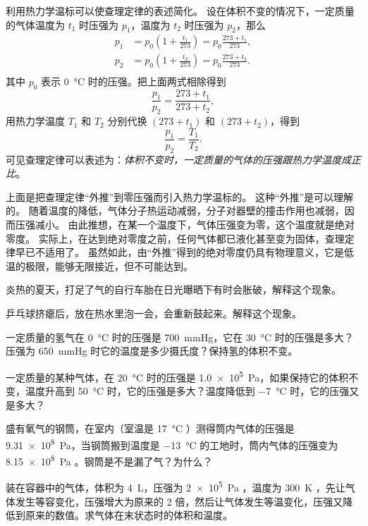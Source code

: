 利用热力学温标可以使查理定律的表述简化。
设在体积不变的情况下，一定质量的气体温度为 $t_1$ 时压强为 $p_1$，温度为 $t_2$ 时压强为 $p_2$，那么
\[\begin{split}
p_1&=p_0\left(1+\frac{t_1}{273}\right)=p_0\frac{273+t_1}{273},\\
p_2&=p_0\left(1+\frac{t_2}{273}\right)=p_0\frac{273+t_2}{273}.\\
\end{split} \]
其中 $p_0$ 表示 \qty{0}{\celsius} 时的压强。把上面两式相除得到
\[\frac{p_1}{p_2}=\frac{273+t_1}{273+t_2},\]
用热力学温度 $T_1$ 和 $T_2$ 分别代换 $(273+t_1)$ 和 $(273+t_2)$，得到
\[\frac{p_1}{p_2}=\frac{T_1}{T_2}.\]
可见查理定律可以表述为：\emph{体积不变时，一定质量的气体的压强跟热力学温度成正比}。

上面是把查理定律“外推”到零压强而引入热力学温标的。
这种“外推”是可以理解的。
随着温度的降低，气体分子热运动减弱，分子对器壁的撞击作用也减弱，因而压强减小。
由此推想，在某一个温度下，气体压强变为零，这个温度就是绝对零度。
实际上，在达到绝对零度之前，任何气体都已液化甚至变为固体，查理定律早已不适用了。
虽然如此，由“外推”得到的绝对零度仍具有物理意义，它是低温的极限，能够无限接近，但不可能达到。

\begin{Practice}
\begin{question}
	\item 炎热的夏天，打足了气的自行车胎在日光曝晒下有时会胀破，解释这个现象。
	\item 乒乓球挤瘪后，放在热水里泡一会，会重新鼓起来。解释这个现象。
	\item 一定质量的氢气在 \qty{0}{\celsius} 时的压强是 \qty{700}{mmHg}，它在 \qty{30}{\celsius} 时的压强是多大？压强为 \qty{650}{mmHg} 时它的温度是多少摄氏度？保持氢的体积不变。
	\item 一定质量的某种气体，在 \qty{20}{\celsius} 时的压强是 \qty{1.0e5}{Pa}，如果保持它的体积不变，温度升高到 \qty{50}{\celsius} 时，它的压强是多大？温度降低到 \qty{-7}{\celsius} 时，它的压强又是多大？
	\item 盛有氧气的钢筒，在室内（室温是 \qty{17}{\celsius} ）测得筒内气体的压强是 \qty{9.31e8}{Pa}，当钢筒搬到温度是 \qty{-13}{\celsius} 的工地时，筒内气体的压强变为 \qty{8.15e8}{Pa} 。钢筒是不是漏了气？为什么？
	\item 装在容器中的气体，体积为 \qty{4}{L}，压强为 \qty{2e5}{Pa} ，温度为 \qty{300}{K} ，先让气体发生等容变化，压强增大为原来的 2 倍，然后让气体发生等温变化，压强又降低到原来的数值。求气体在末状态时的体积和温度。
\end{question}
\end{Practice}

